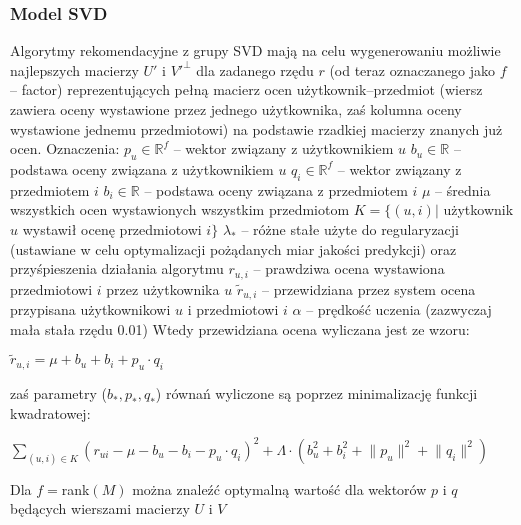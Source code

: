 \documentclass{pracamgr}
\begin{document}
    \subsubsection{Model SVD}
     Algorytmy rekomendacyjne z grupy SVD mają na celu wygenerowaniu możliwie
     najlepszych macierzy $U'$ i $V'^\bot$ dla zadanego rzędu $r$ (od teraz oznaczanego jako $f$ -- factor)
     reprezentujących pełną macierz ocen użytkownik--przedmiot
     (wiersz zawiera oceny wystawione przez jednego użytkownika, zaś kolumna oceny wystawione jednemu przedmiotowi)
     na podstawie rzadkiej macierzy znanych już ocen.\newline
     Oznaczenia:\newline
     $p_u\in\mathbb{R}^f$ -- wektor związany z użytkownikiem $u$\newline
     $b_u\in\mathbb{R}$ -- podstawa oceny związana z użytkownikiem $u$\newline
     $q_i\in\mathbb{R}^f$ -- wektor związany z przedmiotem $i$\newline
     $b_i\in\mathbb{R}$ -- podstawa oceny związana z przedmiotem $i$\newline
     $\mu$ -- średnia wszystkich ocen wystawionych wszystkim przedmiotom\newline
     $K=\{(u,i)|$ użytkownik $u$ wystawił ocenę przedmiotowi $i\}$\newline
     $\lambda_{*}$ -- różne stałe użyte do regularyzacji (ustawiane w celu optymalizacji pożądanych miar jakości predykcji) 
                      oraz przyśpieszenia działania algorytmu\newline 
     $r_{u,i}$ -- prawdziwa ocena wystawiona przedmiotowi $i$ przez użytkownika $u$\newline
     $\tilde{r}_{u,i}$ -- przewidziana przez system ocena przypisana użytkownikowi $u$ i przedmiotowi $i$\newline
     $\alpha$ -- prędkość uczenia (zazwyczaj mała stała rzędu 0.01)\newpage
     Wtedy przewidziana ocena wyliczana jest ze wzoru:     
     \begin{center}
     $\tilde{r}_{u,i}=\mu+b_u+b_i+p_u\cdot q_i$
     \end{center}
     zaś parametry ($b_*,p_*,q_*$) równań wyliczone są poprzez minimalizację funkcji kwadratowej:
     \begin{center}
     $\sum\limits_{(u,i)\in K}(r_{ui}-\mu-b_u-b_i-p_u\cdot q_i)^2+\Lambda\cdot(b_u^2+b_i^2+\lVert p_u\rVert^2+\lVert q_i\rVert^2)$
     \end{center}
     Dla $f=$rank$(M)$ można znaleźć optymalną wartość dla wektorów $p$ i $q$ będących wierszami macierzy $U$ i $V$
\end{document}
